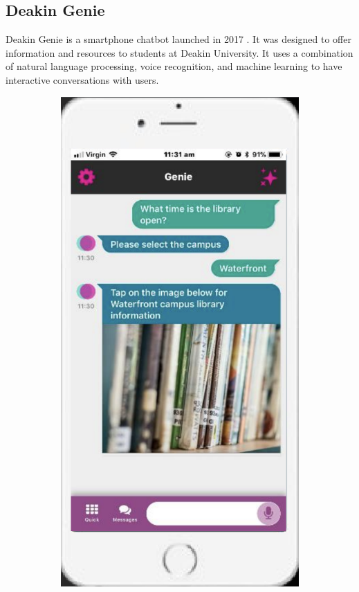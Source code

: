\documentclass{l4proj}
\begin{document}
\subsection{Deakin Genie}

Deakin Genie is a smartphone chatbot launched in 2017 \citep{deakin}. It was designed to offer information and resources to students at Deakin University. It uses a combination of natural language processing, voice recognition, and machine learning to have interactive conversations with users.

\begin{figure}[ht]
  \centering
  \begin{subfigure}[b]{0.22\textwidth}
    \includegraphics[width=\textwidth]{images/genie.png}

\end{subfigure}
\end{figure}
\end{document}
